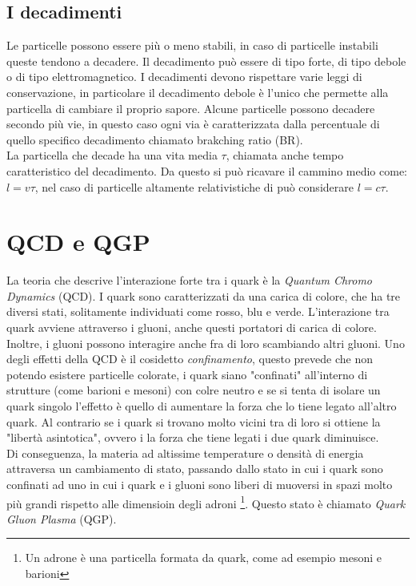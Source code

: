     \subsection{I decadimenti}
    Le particelle possono essere più o meno stabili, in caso di particelle instabili queste tendono a decadere. Il decadimento può essere di tipo forte, di tipo debole o di tipo elettromagnetico. I decadimenti devono rispettare varie leggi di conservazione, in particolare il decadimento debole è l'unico che permette alla particella di cambiare il proprio sapore. Alcune particelle possono decadere secondo più vie, in questo caso ogni via è caratterizzata dalla percentuale di quello specifico decadimento chiamato brakching ratio (BR).
    \\La particella che decade ha una vita media $\tau$, chiamata anche tempo caratteristico del decadimento. Da questo si può ricavare il cammino medio come: $l = v \tau$, nel caso di particelle altamente relativistiche di può considerare $l = c \tau$. 
    
    
\section{QCD e QGP}
La teoria che descrive l'interazione forte tra i quark è la \textit{Quantum Chromo Dynamics} (QCD). I quark sono caratterizzati da una carica di colore, che ha tre diversi stati, solitamente individuati come rosso, blu e verde. L'interazione tra quark avviene attraverso i gluoni, anche questi portatori di carica di colore. Inoltre, i gluoni possono interagire anche fra di loro scambiando altri gluoni. Uno degli effetti della QCD è il cosidetto \textit{confinamento}, questo prevede che non potendo esistere particelle colorate, i quark siano "confinati" all'interno di strutture (come barioni e mesoni) con colre neutro e se si tenta di isolare un quark singolo l'effetto è quello di aumentare la forza che lo tiene legato all'altro quark. Al contrario se i quark si trovano molto vicini tra di loro si ottiene la "libertà asintotica", ovvero i la forza che tiene legati i due quark diminuisce. \cite{libro_nucleare}
\\Di conseguenza, la materia ad altissime temperature o densità di energia attraversa un cambiamento di stato, passando dallo stato in cui i quark sono confinati ad uno in cui i quark e i gluoni sono liberi di muoversi in spazi molto più grandi rispetto alle dimensioin degli adroni \footnote{Un adrone è una particella formata da quark, come ad esempio mesoni e barioni}. Questo stato è chiamato \textit{Quark Gluon Plasma} (QGP). \cite{QCD} 

